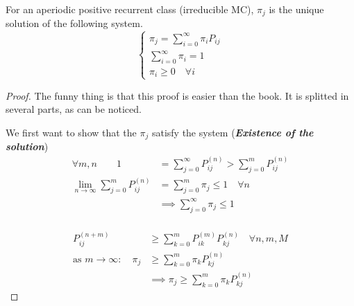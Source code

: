 	\begin{theorem}
		For an aperiodic positive recurrent class (irreducible MC), $\pi_j$ is the unique solution of the following system.
		\begin{equation*}\begin{cases}
			\pi_j = \sum\limits_{i=0}^\infty \pi_i P_{ij} \\
			\sum\limits_{i=0}^\infty \pi_i = 1 \\
			\pi_i \geq 0 \quad \forall i
		\end{cases}\end{equation*}
	\end{theorem}

	\begin{proof} The funny thing is that this proof is easier than the book.
		It is splitted in several parts, as can be noticed.

		\proofpart
			We first want to show that the $\pi_j$ satisfy the system (\textbf{\textit{Existence of the solution}})
			\begin{equation*}
				\begin{split}
					\forall m,n \qquad 1&=\sum\limits_{j=0}^\infty P_{ij}^{(n)} > \sum\limits_{j=0}^m P_{ij}^{(n)}\\
	 			 \lim_{n\to\infty} \sum\limits_{j=0}^m P_{ij}^{(n)} &= \sum\limits_{j=0}^m \pi_j \leq 1 \quad \forall n \\
				 &\implies \sum\limits_{j=0}^\infty \pi_j \leq 1\\
				\end{split}
			\end{equation*}

		\proofpart
			\begin{equation*}
				\begin{split}
					P_{ij}^{(n+m)} &\geq \sum\limits_{k=0}^m P_{ik}^{(m)} P_{kj}^{(n)} \quad \forall n, m, M\\
					\text{as } m \to \infty :\quad \pi_j &\geq \sum\limits_{k=0}^m \pi_k P_{kj}^{(n)}\\
					&\implies  \pi_j \geq \sum\limits_{k=0}^m \pi_k P_{kj}^{(n)}
				\end{split}
			\end{equation*}


\end{proof}
